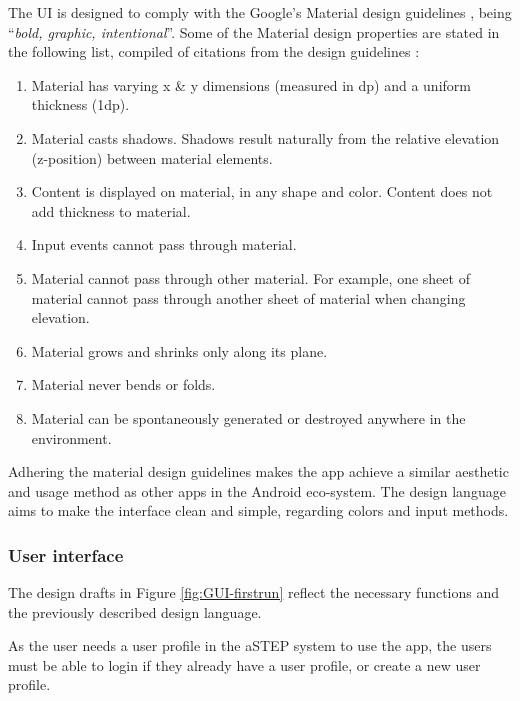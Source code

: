 The UI is designed to comply with the Google's Material design guidelines \cite{materialDesign}, being ``\textit{bold, graphic, intentional}''. 
Some of the Material design properties are stated in the following list, compiled of citations from the design guidelines \cite{materialProperties}:

\begin{enumerate}
	\item Material has varying x \& y dimensions (measured in dp) and a uniform thickness (1dp).
	\item Material casts shadows. Shadows result naturally from the relative elevation (z-position) between material elements.
	\item Content is displayed on material, in any shape and color. Content does not add thickness to material.
	\item Input events cannot pass through material.
	\item Material cannot pass through other material. For example, one sheet of material cannot pass through another sheet of material when changing elevation.
	\item Material grows and shrinks only along its plane.
	\item Material never bends or folds.
	\item Material can be spontaneously generated or destroyed anywhere in the environment.
\end{enumerate} 

Adhering the material design guidelines makes the app achieve a similar aesthetic and usage method as other apps in the Android eco-system. 
The design language aims to make the interface clean and simple, regarding colors and input methods.

\subsubsection{User interface}
The design drafts in Figure \ref{fig:GUI-firstrun} reflect the necessary functions and the previously described design language. 

As the user needs a user profile in the aSTEP system to use the app, the users must be able to login if they already have a user profile, or create a new user profile.

